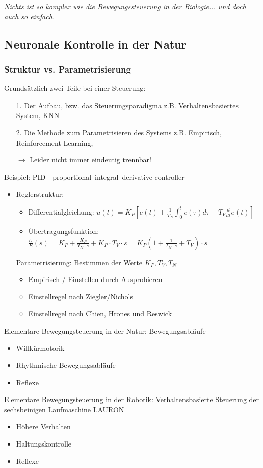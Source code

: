 \emph{Nichts ist so komplex wie die Bewegungssteuerung in der Biologie... und doch auch so einfach.}
\subsection{Neuronale Kontrolle in der Natur}
\subsubsection{Struktur vs. Parametrisierung}
Grundsätzlich zwei Teile bei einer Steuerung:
\begin{itemize}
\item[1.] Der Aufbau, bzw. das Steuerungsparadigma
z.B. Verhaltensbasiertes System, KNN
\item[2.] Die Methode zum Parametrisieren des Systems
z.B. Empirisch, Reinforcement Learning,
\item[$\rightarrow$] Leider nicht immer eindeutig trennbar!
\end{itemize}
Beispiel: PID - proportional–integral–derivative controller
\begin{itemize}
\item Reglerstruktur:
\begin{itemize}
\item Differentialgleichung: $u(t) = K_P\left[e(t) + \frac{1}{T_N}\int_0^te(\tau)d\tau + T_V\frac{d}{dt}e(t)\right]$
\item Übertragungsfunktion: $\frac{U}{E}(s) = K_P + \frac{K_P}{T_N \cdot s}+K_P\cdot T_V\cdot s = K_P(1 + \frac{1}{T_N \cdot s} + T_V) \cdot s$
\end{itemize}
Parametrisierung: Bestimmen der Werte $K_P, T_V, T_N$
\begin{itemize}
\item Empirisch / Einstellen durch Ausprobieren
\item Einstellregel nach Ziegler/Nichols
\item Einstellregel nach Chien, Hrones und Reswick
\end{itemize}
\end{itemize}
Elementare Bewegungsteuerung in der Natur: Bewegungsabläufe
\begin{itemize}
\item Willkürmotorik
\item Rhythmische Bewegungsabläufe
\item Reflexe
\end{itemize}
Elementare Bewegungsteuerung in der Robotik: Verhaltensbasierte Steuerung der sechsbeinigen Laufmaschine LAURON
\begin{itemize}
\item Höhere Verhalten
\item Haltungskontrolle
\item Reflexe
\end{itemize}
